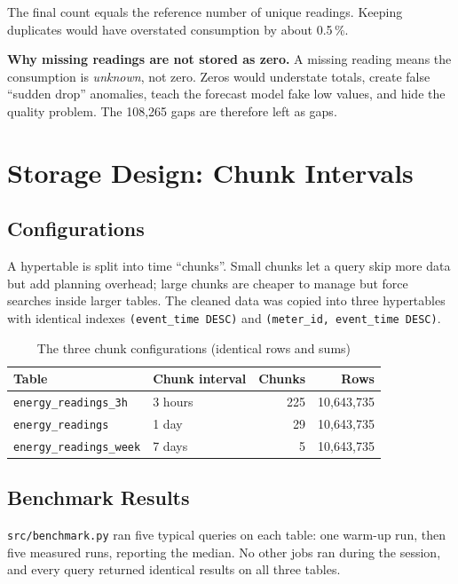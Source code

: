 \documentclass[11pt,a4paper]{article}
\begin{document}
The final count equals the reference number of unique readings. Keeping duplicates would have overstated consumption by about 0.5\,\%.

\textbf{Why missing readings are not stored as zero.} A missing reading means the consumption is \emph{unknown}, not zero. Zeros would understate totals, create false ``sudden drop'' anomalies, teach the forecast model fake low values, and hide the quality problem. The 108,265 gaps are therefore left as gaps.

\section{Storage Design: Chunk Intervals}

\subsection{Configurations}

A hypertable is split into time ``chunks''. Small chunks let a query skip more data but add planning overhead; large chunks are cheaper to manage but force searches inside larger tables. The cleaned data was copied into three hypertables with identical indexes \texttt{(event\_time DESC)} and \texttt{(meter\_id, event\_time DESC)}.

\begin{table}[H]
\centering
\begin{tabular}{llrr}
\toprule
\textbf{Table} & \textbf{Chunk interval} & \textbf{Chunks} & \textbf{Rows} \\
\midrule
\texttt{energy\_readings\_3h} & 3 hours & 225 & 10,643,735 \\
\texttt{energy\_readings} & 1 day & 29 & 10,643,735 \\
\texttt{energy\_readings\_week} & 7 days & 5 & 10,643,735 \\
\bottomrule
\end{tabular}
\caption{The three chunk configurations (identical rows and sums)}
\end{table}

\subsection{Benchmark Results}

\texttt{src/benchmark.py} ran five typical queries on each table: one warm-up run, then five measured runs, reporting the median. No other jobs ran during the session, and every query returned identical results on all three tables.
\end{document}
